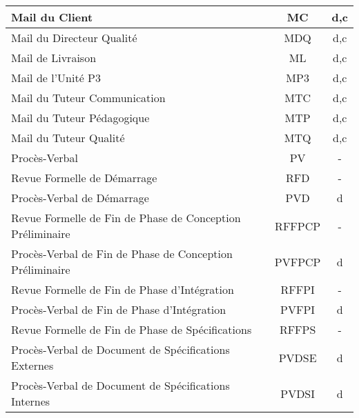 \begin{longtable}{|p{12cm}|c|c|}
    \hline
    \hspace{2cm} Mail du Client & MC & d,c\\
    \hline
    \hspace{2cm} Mail du Directeur Qualité & MDQ & d,c\\
    \hline
    \hspace{2cm} Mail de Livraison & ML & d,c\\
    \hline
    \hspace{2cm} Mail de l'Unité P3 & MP3 & d,c\\
    \hline
    \hspace{2cm} Mail du Tuteur Communication & MTC & d,c\\
    \hline
    \hspace{2cm} Mail du Tuteur Pédagogique & MTP & d,c\\
    \hline
    \hspace{2cm} Mail du Tuteur Qualité & MTQ & d,c\\
    \hline
    \hspace{1cm} Procès-Verbal & PV & -\\
    \hline
    \hspace{2cm} Revue Formelle de Démarrage & RFD & -\\
    \hline
    \hspace{3cm} Procès-Verbal de Démarrage & PVD & d\\
    \hline
    \hspace{2cm} Revue Formelle de Fin de Phase de Conception Préliminaire & RFFPCP & -\\
    \hline
    \hspace{3cm} Procès-Verbal de Fin de Phase de Conception Préliminaire & PVFPCP & d\\
    \hline
    \hspace{2cm} Revue Formelle de Fin de Phase d'Intégration & RFFPI & -\\
    \hline
    \hspace{3cm} Procès-Verbal de Fin de Phase d'Intégration & PVFPI & d\\
    \hline
    \hspace{2cm} Revue Formelle de Fin de Phase de Spécifications & RFFPS & -\\
    \hline
    \hspace{3cm} Procès-Verbal de Document de Spécifications Externes & PVDSE & d\\
    \hline
    \hspace{3cm} Procès-Verbal de Document de Spécifications Internes & PVDSI & d\\

\end{longtable}
